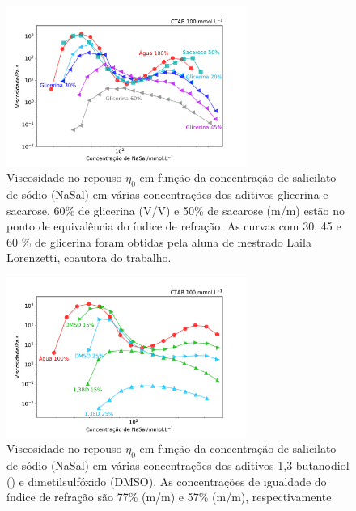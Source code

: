 			\begin{figure}[htb]
				\centering
				\includegraphics[width=0.7\textwidth]{imagens/reologia/RH_sacarose_glicerina}
				\caption{Viscosidade no repouso \(\eta_0\) em função da concentração de salicilato de sódio (NaSal) em várias concentrações dos aditivos glicerina e sacarose. 60\% de glicerina (V/V) e 50\% de sacarose (m/m) estão no ponto de equivalência do índice de refração. As curvas com 30, 45 e 60 \% de glicerina foram obtidas pela aluna de mestrado Laila Lorenzetti, coautora do trabalho.}
				\label{fig:rh_sacarose_glicerina}
			\end{figure}   
			
			\begin{figure}[htb]
				\centering
				\includegraphics[width=0.7\textwidth]{imagens/reologia/RH_13BD_DMSO}
				\caption{Viscosidade no repouso \(\eta_0\) em função da concentração de salicilato de sódio (NaSal) em várias concentrações dos aditivos 1,3-butanodiol (\BD) e dimetilsulfóxido (DMSO). As concentrações de igualdade do índice de refração são 77\% (m/m) e 57\% (m/m), respectivamente}
				\label{fig:rh_13bd_dmso}
			\end{figure}  
			
